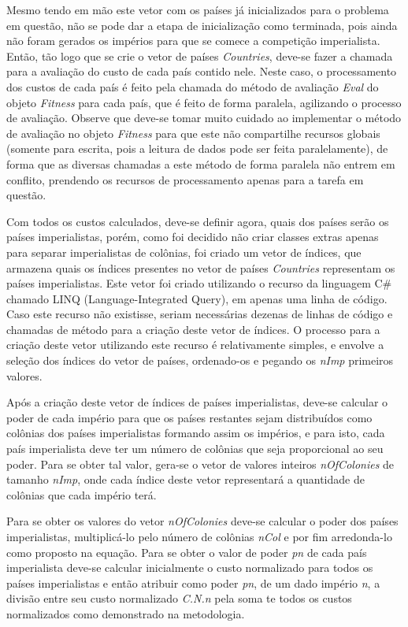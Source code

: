 Mesmo tendo em mão este vetor com os países já inicializados para o problema em questão, não se pode dar a etapa de inicialização como terminada, pois ainda não foram gerados os impérios para que se comece a competição imperialista. Então, tão logo que se crie o vetor de países \emph{Countries}, deve-se fazer a chamada para a avaliação do custo de cada país contido nele. Neste caso, o processamento dos custos de cada país é feito pela chamada do método de avaliação \emph{Eval} do objeto \emph{Fitness} para cada país, que é feito de forma paralela, agilizando o processo de avaliação. Observe que deve-se tomar muito cuidado ao implementar o método de avaliação no objeto \emph{Fitness} para que este não compartilhe recursos globais (somente para escrita, pois a leitura de dados pode ser feita paralelamente), de forma que as diversas chamadas a este método de forma paralela não entrem em conflito, prendendo os recursos de processamento apenas para a tarefa em questão.

Com todos os custos calculados, deve-se definir agora, quais dos países serão os países imperialistas, porém, como foi decidido não criar classes extras apenas para separar imperialistas de colônias, foi criado um vetor de índices, que armazena quais os índices presentes no vetor de países \emph{Countries} representam os países imperialistas. Este vetor foi criado utilizando o recurso da linguagem C\# chamado LINQ (Language-Integrated Query), em apenas uma linha de código. Caso este recurso não existisse, seriam necessárias dezenas de linhas de código e chamadas de método para a criação deste vetor de índices. O processo para a criação deste vetor utilizando este recurso é relativamente simples, e envolve a seleção dos índices do vetor de países, ordenado-os e pegando os \emph{nImp} primeiros valores.

Após a criação deste vetor de índices de países imperialistas, deve-se calcular o poder de cada império para que os países restantes sejam distribuídos como colônias dos países imperialistas formando assim os impérios, e para isto, cada país imperialista deve ter um número de colônias que seja proporcional ao seu poder. Para se obter tal valor, gera-se o vetor de valores inteiros \emph{nOfColonies} de tamanho \emph{nImp}, onde cada índice deste vetor representará a quantidade de colônias que cada império terá. 

Para se obter os valores do vetor \emph{nOfColonies} deve-se calcular o poder dos países imperialistas, multiplicá-lo pelo número de colônias \emph{nCol} e por fim arredonda-lo como proposto na equação. Para se obter o valor de poder \emph{pn} de cada país imperialista deve-se calcular inicialmente o custo normalizado para todos os países imperialistas e então atribuir como poder \emph{pn}, de um dado império \emph{n}, a divisão entre seu custo normalizado \emph{C.N.n} pela soma te todos os custos normalizados como demonstrado na metodologia. 

